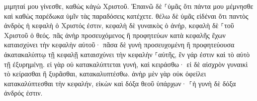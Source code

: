 \documentclass{openreader}
\begin{document}
μιμηταί μου γίνεσθε, καθὼς κἀγὼ Χριστοῦ. 
Ἐπαινῶ δὲ ⸀ὑμᾶς ὅτι πάντα μου μέμνησθε καὶ καθὼς παρέδωκα ὑμῖν τὰς παραδόσεις κατέχετε. 
θέλω δὲ ὑμᾶς εἰδέναι ὅτι παντὸς ἀνδρὸς ἡ κεφαλὴ ὁ Χριστός ἐστιν, κεφαλὴ δὲ γυναικὸς ὁ ἀνήρ, κεφαλὴ δὲ ⸀τοῦ Χριστοῦ ὁ θεός. 
πᾶς ἀνὴρ προσευχόμενος ἢ προφητεύων κατὰ κεφαλῆς ἔχων καταισχύνει τὴν κεφαλὴν αὐτοῦ· 
πᾶσα δὲ γυνὴ προσευχομένη ἢ προφητεύουσα ἀκατακαλύπτῳ τῇ κεφαλῇ καταισχύνει τὴν κεφαλὴν ⸀αὐτῆς, ἓν γάρ ἐστιν καὶ τὸ αὐτὸ τῇ ἐξυρημένῃ. 
εἰ γὰρ οὐ κατακαλύπτεται γυνή, καὶ κειράσθω· εἰ δὲ αἰσχρὸν γυναικὶ τὸ κείρασθαι ἢ ξυρᾶσθαι, κατακαλυπτέσθω. 
ἀνὴρ μὲν γὰρ οὐκ ὀφείλει κατακαλύπτεσθαι τὴν κεφαλήν, εἰκὼν καὶ δόξα θεοῦ ὑπάρχων· ⸀ἡ γυνὴ δὲ δόξα ἀνδρός ἐστιν. 
\end{document}
